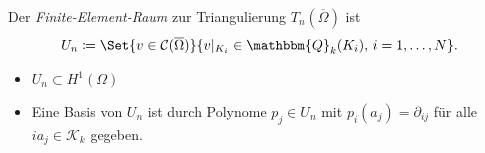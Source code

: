 \documentclass{cheat-sheet}
\newcommand{\Cont}{\mathcal{C}} %
\newcommand{\clos}[1]{\overline{#1}} %
\newcommand{\cOmega}{\clos{\Omega}} %
\newcommand{\Qoly}{\mathbbm{Q}} %
\begin{document}
\begin{defn}
  Der \textit{Finite-Element-Raum} zur Triangulierung $T_n(\cOmega)$ ist
  \[
    U_n \coloneqq \Set{v \in \Cont(\cOmega)}{v|_{K_i} \in \Qoly_k(K_i), \, i = 1, \ldots, N}.
  \]
\end{defn}

\begin{lem}
  \begin{itemize}
    \item $U_n \subset H^1(\Omega)$
    \item Eine Basis von $U_n$ ist durch Polynome $p_j \in U_n$ mit $p_i(a_j) = \partial_{ij}$ für alle $ia_j \in \mathcal{K}_k$ gegeben.
  \end{itemize}
\end{lem}
\end{document}
